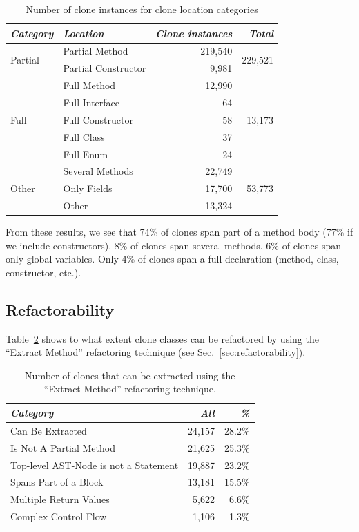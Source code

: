 \documentclass[]{IEEEtran}
\begin{document}
\begin{table}[H]
\centering
\begin{tabular}{@{}llrr@{}}
\toprule
\textit{\textbf{Category}} & \textit{\textbf{Location}} & \textit{\textbf{Clone instances}} & \textit{\textbf{Total}} \\ \midrule
\multirow{2}{*}{Partial} & Partial Method & 219,540 & \multirow{2}{*}{229,521} \\ \cmidrule(lr){2-3}
 & Partial Constructor & 9,981 &  \\ \midrule
\multirow{5}{*}{Full} & Full Method & 12,990 & \multirow{5}{*}{13,173} \\ \cmidrule(lr){2-3}
 & Full Interface & 64 &  \\ \cmidrule(lr){2-3}
 & Full Constructor & 58 &  \\ \cmidrule(lr){2-3}
 & Full Class & 37 &  \\ \cmidrule(lr){2-3}
 & Full Enum & 24 &  \\ \midrule
\multirow{3}{*}{Other} & Several Methods & 22,749 & \multirow{3}{*}{53,773} \\ \cmidrule(lr){2-3}
 & Only Fields & 17,700 &  \\ \cmidrule(lr){2-3}
 & Other & 13,324 &  \\ \bottomrule
\end{tabular}
\caption{Number of clone instances for clone location categories}
\label{tab:location}
\end{table}

From these results, we see that 74\% of clones span part of a method body (77\% if we include constructors). 8\% of clones span several methods. 6\% of clones span only global variables. Only 4\% of clones span a full declaration (method, class, constructor, etc.).

\subsection{Refactorability}
Table~\ref{tab:refactorability} shows to what extent clone classes can be refactored by using the ``Extract Method'' refactoring technique (see Sec.~\ref{sec:refactorability}).

\begin{table}[H]
\centering
\begin{tabular}{@{}lrr@{}}
\toprule
\textit{\textbf{Category}} & \textit{\textbf{All}} & \textit{\textbf{\%}} \\ \midrule
Can Be Extracted & 24,157 & 28.2\%  \\
Is Not A Partial Method & 21,625 & 25.3\% \\
Top-level AST-Node is not a Statement & 19,887 & 23.2\% \\
Spans Part of a Block & 13,181 & 15.5\%  \\
Multiple Return Values & 5,622 & 6.6\%  \\
Complex Control Flow & 1,106 & 1.3\% \\
\end{tabular}
\caption{Number of clones that can be extracted using the ``Extract Method'' refactoring technique.}
\label{tab:refactorability}
\end{table}
\end{document}
